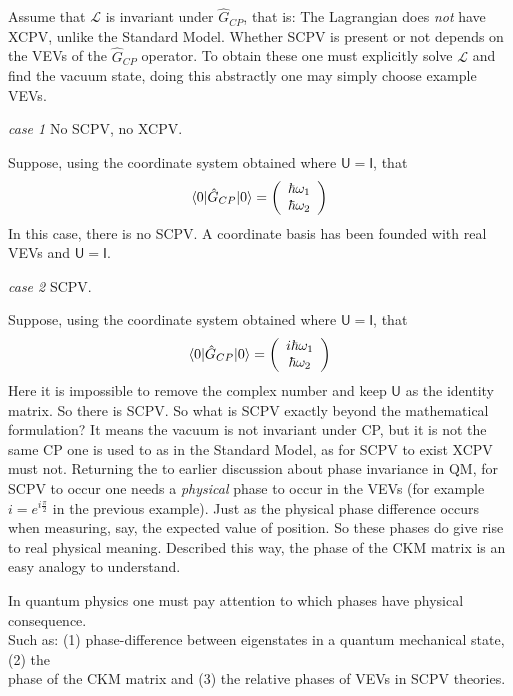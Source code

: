 Assume that $\mathcal{L}$ is invariant under $\hat{G}_{CP}$, that is: The Lagrangian does \textit{not} have XCPV, unlike the Standard Model. Whether SCPV is present or not depends on the VEVs of the $\hat{G}_{CP}$ operator. To obtain these one must explicitly solve $\mathcal{L}$ and find the vacuum state, doing this abstractly one may simply choose example VEVs.\\

\begin{flushleft}\textit{case 1} No SCPV, no XCPV. \end{flushleft}
Suppose, using the coordinate system obtained where $\mathsf{U}=\mathsf{I}$, that
\begin{align*}
\braket{0|\hat{G}_{CP}|0} = \left( \begin{array}{c} \hbar \omega_1 \\ \hbar \omega_2 \end{array}\right)
\end{align*}
In this case, there is no SCPV. A coordinate basis has been founded with real VEVs and $\mathsf{U} = \mathsf{I}$.

\begin{flushleft}\textit{case 2} SCPV. \end{flushleft}
Suppose, using the coordinate system obtained where $\mathsf{U}=\mathsf{I}$, that
\begin{align*}
\braket{0|\hat{G}_{CP}|0} = \left( \begin{array}{c} i\hbar \omega_1 \\ \hbar \omega_2 \end{array}\right)
\end{align*}
Here it is impossible to remove the complex number and keep $\mathsf{U}$ as the identity matrix. So there is SCPV. So what is SCPV exactly beyond the mathematical formulation? It means the vacuum is not invariant under CP, but it is not the same CP one is used to as in the Standard Model, as for SCPV to exist XCPV must not. Returning the to earlier discussion about phase invariance in QM, for SCPV to occur one needs a \textit{physical} phase to occur in the VEVs (for example $i=e^{i\frac{\pi}{2}}$ in the previous example). Just as the physical phase difference occurs when measuring, say, the expected value of position. So these phases do give rise to real physical meaning. Described this way, the phase of the CKM matrix is an easy analogy to understand.

\begin{center}
In quantum physics one must pay attention to which phases have physical consequence. \\Such as: (1) phase-difference between eigenstates in a quantum mechanical state, (2) the\\ phase of the CKM matrix and (3) the relative phases of VEVs in SCPV theories.
\end{center}


